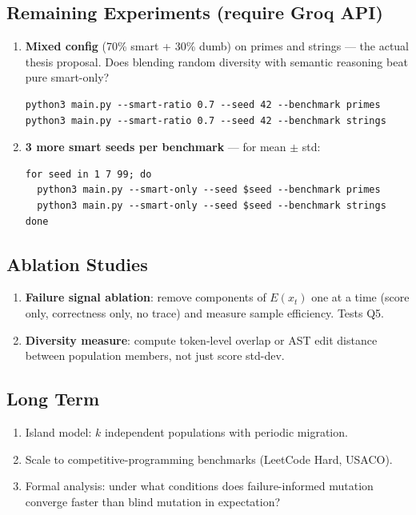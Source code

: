 \documentclass[11pt,a4paper]{article}
\begin{document}
\subsection{Remaining Experiments (require Groq API)}
\begin{enumerate}
  \item \textbf{Mixed config} (70\% smart + 30\% dumb) on primes and strings —
    the actual thesis proposal. Does blending random diversity with semantic
    reasoning beat pure smart-only?
    \begin{lstlisting}[numbers=none]
python3 main.py --smart-ratio 0.7 --seed 42 --benchmark primes
python3 main.py --smart-ratio 0.7 --seed 42 --benchmark strings
    \end{lstlisting}
  \item \textbf{3 more smart seeds per benchmark} — for mean $\pm$ std:
    \begin{lstlisting}[numbers=none]
for seed in 1 7 99; do
  python3 main.py --smart-only --seed $seed --benchmark primes
  python3 main.py --smart-only --seed $seed --benchmark strings
done
    \end{lstlisting}
\end{enumerate}

\subsection{Ablation Studies}
\begin{enumerate}
  \item \textbf{Failure signal ablation}: remove components of $E(x_t)$ one
    at a time (score only, correctness only, no trace) and measure sample
    efficiency. Tests Q5.
  \item \textbf{Diversity measure}: compute token-level overlap or AST edit
    distance between population members, not just score std-dev.
\end{enumerate}

\subsection{Long Term}
\begin{enumerate}
  \item Island model: $k$ independent populations with periodic migration.
  \item Scale to competitive-programming benchmarks (LeetCode Hard, USACO).
  \item Formal analysis: under what conditions does failure-informed mutation
    converge faster than blind mutation in expectation?
\end{enumerate}
\end{document}
